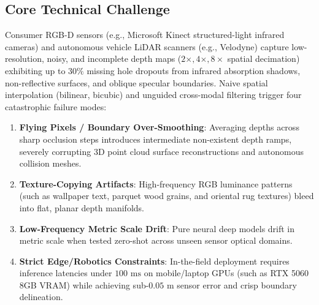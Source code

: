 \documentclass[10pt,a4paper]{article}
\begin{document}
\subsection{Core Technical Challenge}
Consumer RGB-D sensors (e.g., Microsoft Kinect structured-light infrared cameras) and autonomous vehicle LiDAR scanners (e.g., Velodyne) capture low-resolution, noisy, and incomplete depth maps ($2\times, 4\times, 8\times$ spatial decimation) exhibiting up to $30\%$ missing hole dropouts from infrared absorption shadows, non-reflective surfaces, and oblique specular boundaries. Naive spatial interpolation (bilinear, bicubic) and unguided cross-modal filtering trigger four catastrophic failure modes:
\begin{enumerate}[leftmargin=*]
    \item \textbf{Flying Pixels / Boundary Over-Smoothing}: Averaging depths across sharp occlusion steps introduces intermediate non-existent depth ramps, severely corrupting 3D point cloud surface reconstructions and autonomous collision meshes.
    \item \textbf{Texture-Copying Artifacts}: High-frequency RGB luminance patterns (such as wallpaper text, parquet wood grains, and oriental rug textures) bleed into flat, planar depth manifolds.
    \item \textbf{Low-Frequency Metric Scale Drift}: Pure neural deep models drift in metric scale when tested zero-shot across unseen sensor optical domains.
    \item \textbf{Strict Edge/Robotics Constraints}: In-the-field deployment requires inference latencies under $100\text{ ms}$ on mobile/laptop GPUs (such as RTX 5060 8GB VRAM) while achieving sub-$0.05\text{ m}$ sensor error and crisp boundary delineation.
\end{enumerate}
\end{document}
